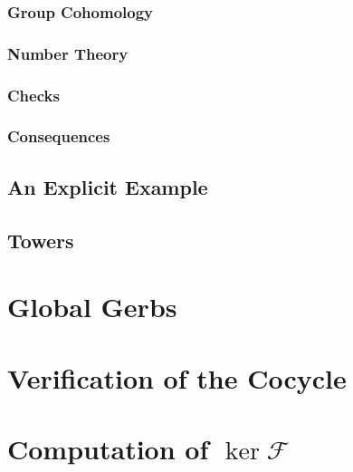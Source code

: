 \documentclass{article}
\numberwithin{equation}{section}
\begin{document}
\subsubsection{Group Cohomology}


\subsubsection{Number Theory}


\subsubsection{Checks}


\subsubsection{Consequences}


\subsection{An Explicit Example}


\subsection{Towers}


\section{Global Gerbs}


\printbibliography[title={References}]

\newpage
\appendix
\section{Verification of the Cocycle} \label{sec:verifycocycle}


\section{Computation of \texorpdfstring{$\ker\mathcal F$}{ker F}} \label{sec:havegensproof}

\end{document}
